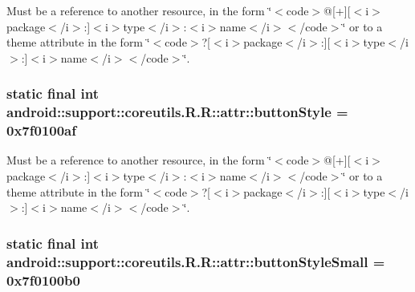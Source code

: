 Must be a reference to another resource, in the form \char`\"{}$<$code$>$@\mbox{[}+\mbox{]}\mbox{[}$<$i$>$package$<$/i$>$:\mbox{]}$<$i$>$type$<$/i$>$:$<$i$>$name$<$/i$>$$<$/code$>$\char`\"{} or to a theme attribute in the form \char`\"{}$<$code$>$?\mbox{[}$<$i$>$package$<$/i$>$:\mbox{]}\mbox{[}$<$i$>$type$<$/i$>$:\mbox{]}$<$i$>$name$<$/i$>$$<$/code$>$\char`\"{}. \hypertarget{classandroid_1_1support_1_1coreutils_1_1_r_1_1attr_6a701227b18284448aec8cb9fbe6ae6d}{
\subsubsection[{buttonStyle}]{\setlength{\rightskip}{0pt plus 5cm}static final int android::support::coreutils.R.R::attr::buttonStyle = 0x7f0100af}}
\label{classandroid_1_1support_1_1coreutils_1_1_r_1_1attr_6a701227b18284448aec8cb9fbe6ae6d}


Must be a reference to another resource, in the form \char`\"{}$<$code$>$@\mbox{[}+\mbox{]}\mbox{[}$<$i$>$package$<$/i$>$:\mbox{]}$<$i$>$type$<$/i$>$:$<$i$>$name$<$/i$>$$<$/code$>$\char`\"{} or to a theme attribute in the form \char`\"{}$<$code$>$?\mbox{[}$<$i$>$package$<$/i$>$:\mbox{]}\mbox{[}$<$i$>$type$<$/i$>$:\mbox{]}$<$i$>$name$<$/i$>$$<$/code$>$\char`\"{}. \hypertarget{classandroid_1_1support_1_1coreutils_1_1_r_1_1attr_e39347a65a17c2c64c33ec0c06d8c9d6}{
\subsubsection[{buttonStyleSmall}]{\setlength{\rightskip}{0pt plus 5cm}static final int android::support::coreutils.R.R::attr::buttonStyleSmall = 0x7f0100b0}}
\label{classandroid_1_1support_1_1coreutils_1_1_r_1_1attr_e39347a65a17c2c64c33ec0c06d8c9d6}


